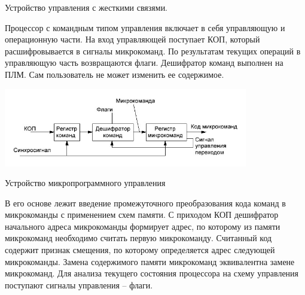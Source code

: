\documentclass[unicode, 12pt, a4paper, oneside]{article}
\begin{document}
Устройство управления с жесткими связями.

Процессор с командным типом управления включает в себя управляющую и операционную части. На вход управляющей поступает КОП, который расшифровывается в сигналы микрокоманд. По результатам текущих операций в управляющую часть возвращаются флаги.
Дешифратор команд выполнен на ПЛМ. Сам пользователь не может изменить ее содержимое.

\begin{center}
\includegraphics[width=0.8\textwidth]{120_microcom.png}
\end{center}
Устройство микропрограммного управления

В его основе лежит введение промежуточного преобразования кода команд в микрокоманды с применением схем памяти. С приходом КОП дешифратор начального адреса микрокоманды формирует адрес, по которому из памяти микрокоманд необходимо считать первую микрокоманду. Считанный код содержит признак смещения, по которому определяется адрес следующей микрокоманды. Замена содержимого памяти микрокоманд эквивалентна замене микрокоманд. Для анализа текущего состояния процессора на схему управления поступают сигналы управления – флаги.
\end{document}
